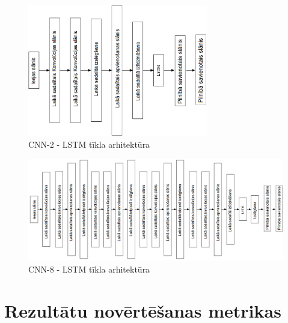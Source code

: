 \documentclass[12pt,paper=A4]{report}
\begin{document}
\begin{figure}[H] \centering
\includegraphics[width=0.70\textwidth]{CNN2LSTMtikls} \caption{CNN-2 - LSTM tīkla arhitektūra}  
\label{cnn2lstmarch} 
\end{figure}

\begin{figure}[H] \centering
\includegraphics[width=1.05\textwidth]{CNN8LSTMtikls} \caption{CNN-8 - LSTM tīkla arhitektūra}  
\label{cnn8lstmarch} 
\end{figure}


\section{Rezultātu novērtēšanas metrikas}
\end{document}
